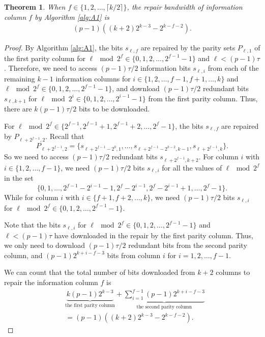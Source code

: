 \documentclass[conference]{IEEEtran}
\newtheorem{theorem}{Theorem}
\begin{document}
\begin{theorem}
When $f\in\{1, 2,\ldots, \lceil k/2 \rceil\}$, the repair bandwidth of information column $f$ by Algorithm \ref{alg:A1} is
\begin{align*}
(p-1)((k+2)2^{k-3}-2^{k-f-2}).
\end{align*}
\label{thmrep}
\vspace{-0.5cm}
\end{theorem}
\begin{proof}
By Algorithm \ref{alg:A1}, the bits $s_{\ell,f}$ are repaired by the parity sets $P_{\ell,1}$ of the first parity column for $\ell \mod 2^f \in \{0,1,2,\ldots,2^{f-1}-1\}$ and $\ell < (p-1)\tau$. Therefore, we need to access $(p-1)\tau/2$ information bits $s_{\ell,i}$ from each of the remaining $k-1$ information columns for $i\in\{1,2,\ldots,f-1,f+1,\ldots,k\}$ and $\ell \mod 2^f \in \{0,1,2,\ldots,2^{f-1}-1\}$, and download $(p-1)\tau/2$ redundant bits $s_{\ell,k+1}$ for $\ell \mod 2^i \in \{0,1,2,\ldots,2^{i-1}-1\}$ from the first parity column. Thus, there are $k(p-1)\tau/2$
bits to be downloaded.

For $\ell \mod 2^f \in \{2^{f-1},2^{f-1}+1,2^{f-1}+2,\ldots,2^{f}-1\}$, the bits $s_{\ell,f}$ are repaired by $P_{\ell+2^{f-1},2}$. Recall that
$$P_{\ell+2^{f-1},2}=\{s_{\ell+2^{f-1}-2^{0},1},\ldots,s_{\ell+2^{f-1}-2^{k-2},k-1},s_{\ell+2^{f-1},k}\}.$$
So we need to access $(p-1)\tau/2$ redundant bits $s_{\ell+2^{f-1},k+2}$. For column $i$ with $i\in\{1,2,\ldots,f-1\}$, we need $(p-1)\tau/2$ bits $s_{\ell,i}$ for all the values of $\ell \mod 2^f$ in the set
$$\{0,1, \ldots, 2^{f-1}-2^{i-1}-1,2^{f}-2^{i-1},2^{f}-2^{i-1}+1,\ldots,2^{f}-1\}.$$
While for column $i$ with $i\in\{f+1,f+2,\ldots,k\}$, we need $(p-1)\tau/2$ bits $s_{\ell,i}$ for $\ell \mod 2^f \in \{0,1,2,\ldots,2^{f-1}-1\}$.

Note that the bits $s_{\ell,i}$ for $\ell \mod 2^f \in \{0,1,2,\ldots,2^{f-1}-1\}$ and $\ell < (p-1)\tau$ have downloaded in the repair by the first parity column. Thus, we only need to download $(p-1)\tau/2$ redundant bits from the second parity column, and
$(p-1)2^{k+i-f-3}$
bits from column $i$ for $i=1,2,\ldots,f-1$.

We can count that the total number of bits downloaded from $k+2$ columns to repair the information column $f$ is
\begin{align*}
&\underbrace{k(p-1)2^{k-3}}_{\text{the first parity column}}+\underbrace{\sum_{i=1}^{f-1}(p-1)2^{k+i-f-3}}_{\text{the second parity column}}\\
&=(p-1)((k+2)2^{k-3}-2^{k-f-2}).
\end{align*}
\end{proof}
\end{document}
